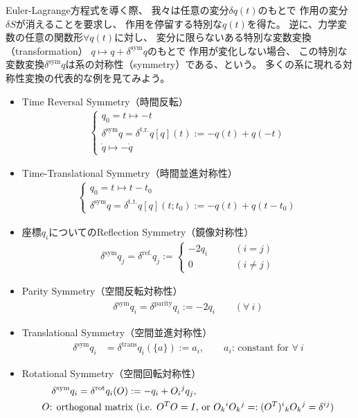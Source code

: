 Euler-Lagrange方程式を導く際、
我々は任意の変分$\delta q(t)$のもとで
作用の変分$\delta S$が消えることを要求し、
作用を停留する特別な$q(t)$を得た。
逆に、力学変数の任意の関数形$\forall q(t)$に対し、
変分に限らないある特別な変数変換（transformation）
$q \mapsto q + \delta^{\mathrm{sym}} q$のもとで
作用が変化しない場合、
この特別な変数変換$\delta^{\mathrm{sym}} q$は系の対称性（symmetry）である、という。
多くの系に現れる対称性変換の代表的な例を見てみよう。
\begin{itemize}
  \item{Time Reversal Symmetry（時間反転）}
  \begin{align}
    \begin{cases}
      q_0 = t \mapsto -t
      \\
      \delta^{\mathrm{sym}} q
      =
      \delta^{\mathrm{t.r.}} q [q](t)
      := -q(t) + q(-t)
      \\
      \dot{q} \mapsto -\dot{q}
    \end{cases}
  \end{align}
  \item {Time-Translational Symmetry（時間並進対称性）}
  \begin{align}
    \begin{cases}
      q_0 = t \mapsto t - t_0
      \\
      \delta^{\mathrm{sym}} q
      =
      \delta^{\mathrm{t.t.}} q[q](t; t_0)
      := -q(t) + q(t-t_0)
    \end{cases}
  \label{time translation}
  \end{align}
  \item {座標$q_i$についてのReflection Symmetry（鏡像対称性）}
  \begin{align}
    \delta^{\mathrm{sym}} q_j
    =
    \delta^{\mathrm{ref.}} q_j
    :=
    \begin{cases}
    - 2 q_i
    \qquad &(i = j)
    \\
    0
    \qquad &(i\neq j)
    \end{cases}
  \end{align}
  \item {Parity Symmetry（空間反転対称性）}
  \begin{align}
      \delta^{\mathrm{sym}} q_i
      =
      \delta^{\mathrm{parity}} q_i
      := - 2 q_i
  \qquad
  (\forall\ i)
  \end{align}
  \item {Translational Symmetry（空間並進対称性）}
  \begin{align}
    \delta^{\mathrm{sym}} q_i
    &=
    \delta^{\mathrm{trans}}q_i (\{a\} )
    := a_i
    ,\qquad\text{$a_i$: constant for $\forall\ i$}
  \end{align}
  \item {Rotational Symmetry（空間回転対称性）}
  \begin{align}
    &\quad\delta^{\mathrm{sym}} q_i
    =
    \delta^{\mathrm{rot}}q_i ( O )
    := -q_i + O_i{}^j q_j
    ,\\
    &\text{$O$: orthogonal matrix
    (i.e.
      $O^T O = I$, or
      $O_k{}^i O_k{}^j
      =:
      (O^T)^i{}_k O_k{}^j
      =
      \delta^{ij}$)}
  \notag
  \end{align}
\end{itemize}
